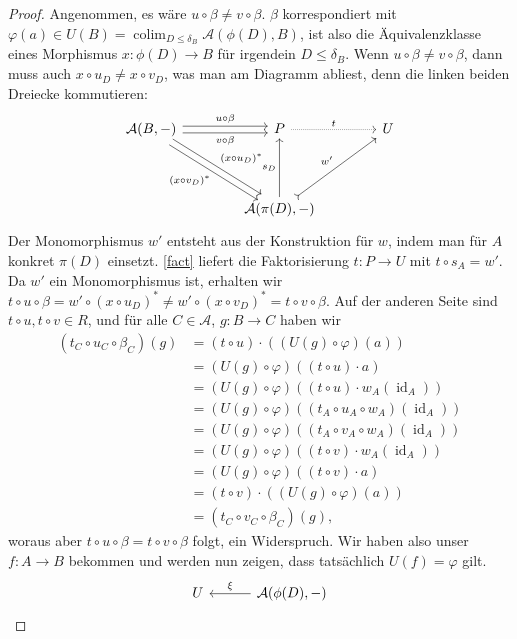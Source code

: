 \documentclass[a4paper, parskip=half,11pt]{scrartcl}
\theoremstyle{marginbreak}
\theoremstyle{nonumberplain}
\newtheorem{proof}{Beweis.}
\newcommand\cat\mathcal
\newcommand{\n}{\pgfmatrixnextcell}
\DeclareMathOperator{\colim}{colim}
\DeclareMathOperator{\id}{id}
\begin{document}
{\begin{proof}
			Angenommen, es wäre $u\circ\beta\neq v\circ\beta$. $\beta$ korrespondiert
			mit $\varphi(a)\in U(B) = \colim_{D\leq\delta_B}\cat{A}(\phi(D), B)$, ist
			also die Äquivalenzklasse eines Morphismus $x\colon\phi(D)\to B$ für
			irgendein $D\leq\delta_B$. Wenn $u\circ\beta\neq v\circ\beta$, dann muss
			auch $x\circ u_D\neq x\circ v_D$, was man am Diagramm abliest, denn die
			linken beiden Dreiecke kommutieren:
			\[
				\begin{tikzcd}[sep=4em]
					\cat{A}(B,{-})
						\ar[shift left]{r}{u\circ\beta}
						\ar[shift right, ']{r}{v\circ\beta}
						\ar[shift left]{dr}{(x\circ u_D)^*}
						\ar[shift right, ']{dr}{(x\circ v_D)^*} \n
					P
						\ar[densely dotted]{r}{t} \n
					U \\ \n
					\cat{A}(\pi(D),{-})
						\ar[tail]{ru}{w'}
						\ar{u}{s_D}
				\end{tikzcd}
			\]
			Der Monomorphismus $w'$ entsteht aus der Konstruktion für $w$, indem
			man für $A$ konkret $\pi(D)$ einsetzt. \ref{fact} liefert die Faktorisierung
			$t\colon P\to U$ mit $t\circ s_A=w'$. Da $w'$ ein Monomorphismus ist, erhalten
			wir $t\circ u\circ\beta=w'\circ(x\circ u_D)^*\neq w'\circ(x\circ v_D)^*=t\circ v\circ\beta$.
			Auf der anderen Seite sind $t\circ u, t\circ v\in R$, und für alle $C\in\cat{A}$,
			$g\colon B\to C$ haben wir
			\begin{align*}
				(t_C\circ u_C\circ \beta_C)(g) &= (t\circ u)\cdot((U(g)\circ\varphi)(a))\\
					&= (U(g)\circ\varphi)((t\circ u)\cdot a)\\
					&= (U(g)\circ\varphi)((t\circ u)\cdot w_A(\id_A))\\
					&= (U(g)\circ\varphi)((t_A\circ u_A\circ w_A)(\id_A))\\
					&= (U(g)\circ\varphi)((t_A\circ v_A\circ w_A)(\id_A))\\
					&= (U(g)\circ\varphi)((t\circ v)\cdot w_A(\id_A))\\
					&= (U(g)\circ\varphi)((t\circ v)\cdot a)\\
					&= (t\circ v)\cdot((U(g)\circ\varphi)(a))\\
					&= (t_C\circ v_C\circ\beta_C)(g),
			\end{align*}
			woraus aber $t\circ u\circ\beta=t\circ v\circ\beta$ folgt, ein Widerspruch.
			Wir haben also unser $f\colon A\to B$ bekommen und werden nun zeigen, dass
			tatsächlich $U(f)=\varphi$ gilt.
			\[
				\begin{tikzcd}[sep=3em]
					U \n
					\cat{A}(\phi(D),{-})
						\ar[']{l}{\xi}

\end{tikzcd}\]
\end{proof}}
\end{document}
